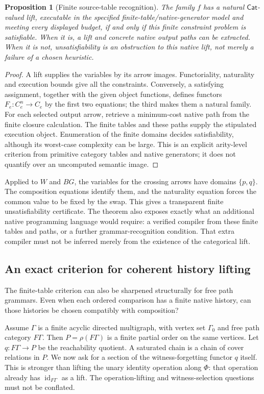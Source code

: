 \documentclass[11pt]{article}
\newtheorem{proposition}[theorem]{Proposition}
\theoremstyle{definition}
\theoremstyle{remark}
\newcommand{\id}{\operatorname{id}}
\begin{document}
\begin{proposition}[Finite source-table recognition]
\label{prop:dc-finite-csp}
The family $f$ has a natural $\mathsf{Cat}$-valued lift, executable in the
specified finite-table/native-generator model and meeting every displayed
budget, if and only if this finite constraint problem is satisfiable.
When it is, a lift and concrete native output paths can be extracted.
When it is not, unsatisfiability is an obstruction to this native lift,
not merely a failure of a chosen heuristic.
\end{proposition}
\begin{proof}
A lift supplies the variables by its arrow images. Functoriality,
naturality and execution bounds give all the constraints. Conversely,
a satisfying assignment, together with the given object functions,
defines functors $F_e:C_e^n\to C_e$ by the first two equations; the third
makes them a natural family. For each selected output arrow, retrieve a
minimum-cost native path from the finite closure calculation. The finite
tables and these paths supply the stipulated execution object. Enumeration
of the finite domains decides satisfiability, although its worst-case
complexity can be large. This is an explicit arity-level criterion from
primitive category tables and native generators; it does not quantify
over an uncomputed semantic image.
\end{proof}

Applied to $W$ and $BG$, the variables for the crossing arrows have
domains $\{p,q\}$. The composition equations identify them, and the
naturality equation forces the common value to be fixed by the swap.
This gives a transparent finite unsatisfiability certificate.
The theorem also exposes exactly what an additional native programming
language would require: a verified compiler from these finite tables and
paths, or a further grammar-recognition condition. That extra compiler
must not be inferred merely from the existence of the categorical lift.

\subsection{An exact criterion for coherent history lifting}
The finite-table criterion can also be sharpened structurally for free
path grammars. Even when each
ordered comparison has a finite native history, can those histories be
chosen compatibly with composition?

Assume $\Gamma$ is a finite acyclic directed multigraph, with vertex set
$\Gamma_0$ and free path category $F\Gamma$. Then $P=\rho(F\Gamma)$ is a finite
partial order on the same vertices. Let
$q:F\Gamma\to P$ be the reachability quotient. A saturated chain is a
chain of cover relations in $P$. We now ask for a section of the
witness-forgetting functor $q$ itself. This is stronger than lifting the
unary identity operation along $\Phi$: that operation already has
$\id_{F\Gamma}$ as a lift. The operation-lifting and witness-selection
questions must not be conflated.
\end{document}
